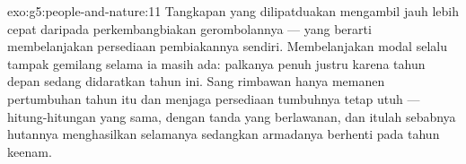 \begin{solution}{exo:g5:people-and-nature:11}
Tangkapan yang dilipatduakan mengambil  jauh lebih cepat daripada
perkembangbiakan gerombolannya --- yang berarti membelanjakan
persediaan pembiakannya sendiri. Membelanjakan modal selalu tampak
gemilang selama ia masih ada: palkanya penuh justru karena  tahun
depan sedang didaratkan tahun ini. Sang rimbawan hanya memanen
pertumbuhan tahun itu dan menjaga persediaan tumbuhnya tetap utuh ---
hitung-hitungan yang sama, dengan tanda yang berlawanan, dan itulah
sebabnya hutannya menghasilkan selamanya sedangkan armadanya berhenti
pada tahun keenam.
\end{solution}
